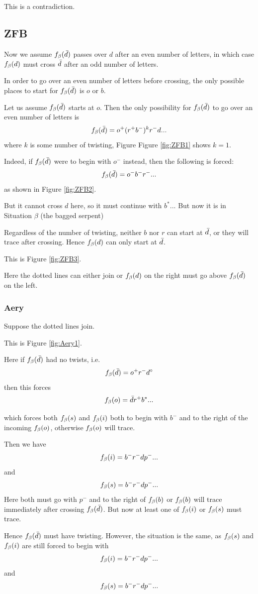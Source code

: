 This is a contradiction.


\subsection{ZFB}\label{ZFB}
Now we assume $f_\beta(\bar{d})$ passes over $d$ after an even number of letters, in which case $f_\beta(d)$ must cross $\bar{d}$ after an odd number of letters.

In order to go over an even number of letters before crossing, the only possible places to start for $f_\beta(\bar{d})$ is $o$ or $b$.

Let us assume $f_\beta(\bar{d})$ starts at $o$. Then the only possibility for $f_\beta(\bar{d})$ to go over an even number of letters is 
\[
f_\beta(\bar{d}) = o^+ (r^+ b^-)^k r^- d...
\]
where $k$ is some number of twisting, Figure Figure \ref{fig:ZFB1} shows $k=1$.

Indeed, if $f_\beta(\bar{d})$ were to begin with $o^-$ instead, then the following is forced:
\[
f_\beta(\bar{d}) = o^- b^- r^-...
\]
as shown in Figure \ref{fig:ZFB2}. 

But it cannot cross $d$ here, so it must continue with $b^*...$ But now it is in Situation $\beta$ (the bagged serpent)


Regardless of the number of twisting, neither $b$ nor $r$ can start at $\bar{d}$, or they will trace after crossing. Hence $f_\beta(d)$ can only start at $\bar{d}$.

This is Figure \ref{fig:ZFB3}.

Here the dotted lines can either join or $f_\beta(d)$ on the right must go above $f_\beta(\bar{d})$ on the left.

\subsubsection{Aery}\label{Aery}
Suppose the dotted lines join. 

This is Figure \ref{fig:Aery1}.

Here if $f_\beta(\bar{d})$ had no twists, i.e.
\[
f_\beta(\bar{d}) = o^+ r^- d^\circ
\]
then this forces
\[
f_\beta(o) = \bar{d} r^+ b^*...
\]

which forces both $f_\beta(s)$ and $f_\beta(i)$ both to begin with $b^-$ and to the right of the incoming $f_\beta(o)$, otherwise $f_\beta(o)$ will trace.

Then we have
\[
f_\beta(i) = b^- r^- d p^-...
\]
and
\[
f_\beta(s) = b^- r^- d p^-...
\]
Here both must go with $p^-$ and to the right of $f_\beta(b)$ or $f_\beta(b)$ will trace immediately after crossing $f_\beta(\bar{d})$. But now at least one of $f_\beta(i)$ or $f_\beta(s)$ must trace.

Hence $f_\beta(\bar{d})$ must have twisting. However, the situation is the same, as $f_\beta(s)$ and $f_\beta(i)$ are still forced to begin with
\[
f_\beta(i) = b^- r^- d p^-...
\]
and
\[
f_\beta(s) = b^- r^- d p^-...
\]

